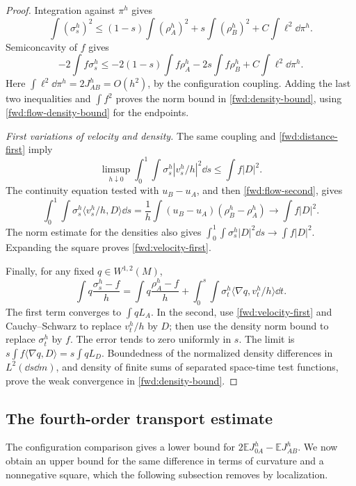 \begin{proof}
Integration against \(\pi^h\) gives
\[
 \int(\sigma^h_s)^2
 \leq(1-s)\int(\rho^h_A)^2+s\int(\rho^h_B)^2
      +C\int\ell^2\dd\pi^h.
\]
Semiconcavity of \(f\) gives
\[
 -2\int f\sigma^h_s
 \leq-2(1-s)\int f\rho^h_A-2s\int f\rho^h_B
      +C\int\ell^2\dd\pi^h.
\]
Here \(\int\ell^2\dd\pi^h=2J^h_{AB}=O(h^2)\), by the
configuration coupling. Adding the last two inequalities and
\(\int f^2\) proves the norm bound in
\eqref{fwd:density-bound}, using
\eqref{fwd:flow-density-bound} for the endpoints.

\emph{First variations of velocity and density.}
The same coupling and \eqref{fwd:distance-first} imply
\[
 \limsup_{h\downarrow0}\int_0^1\int
     \sigma^h_s|v^h_s/h|^2\dd s\leq\int f|D|^2.
\]
The continuity equation tested with \(u_B-u_A\), and then
\eqref{fwd:flow-second}, gives
\[
 \int_0^1\int\sigma^h_s\langle v^h_s/h,D\rangle\dd s
 =\frac1h\int(u_B-u_A)(\rho^h_B-\rho^h_A)
 \longrightarrow\int f|D|^2.
\]
The norm estimate for the densities also gives
\(\int_0^1\int\sigma^h_s|D|^2\dd s\to\int f|D|^2\).
Expanding the square proves \eqref{fwd:velocity-first}.

Finally, for any fixed \(q\in W^{1,2}(M)\),
\[
 \int q\frac{\sigma^h_s-f}{h}
 =\int q\frac{\rho^h_A-f}{h}
   +\int_0^s\int\sigma^h_t\langle\nabla q,v^h_t/h\rangle\dd t.
\]
The first term converges to \(\int qL_A\). In the second, use
\eqref{fwd:velocity-first} and Cauchy--Schwarz to replace
\(v^h_t/h\) by \(D\); then use the density norm bound to replace
\(\sigma^h_t\) by \(f\). The error tends to zero uniformly in
\(s\). The limit is \(s\int f\langle\nabla q,D\rangle
=s\int qL_D\). Boundedness of the normalized density differences
in \(L^2(\dd s\dd m)\), and density of finite sums of separated
space-time test functions, prove the weak convergence in
\eqref{fwd:density-bound}.
\end{proof}

\subsection{The fourth-order transport estimate}

The configuration comparison gives a lower bound for
\(2\mathbb E J^h_{0A}-\mathbb E J^h_{AB}\). We now obtain an
upper bound for the same difference in terms of curvature and a
nonnegative square, which the following subsection removes by
localization.

